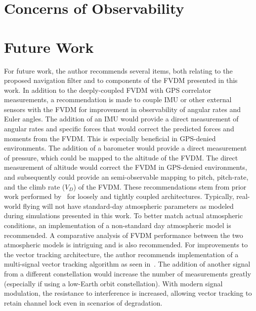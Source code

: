 \section{\textbf{Concerns of Observability}}
\section{\textbf{Future Work}}
For future work, the author recommends several items, both relating to the proposed navigation filter and to components of the FVDM presented in this work. In addition to the deeply-coupled FVDM with GPS correlator measurements, a recommendation is made to couple IMU or other external sensors with the FVDM for improvement in observability of angular rates and Euler angles. The addition of an IMU would provide a direct measurement of angular rates and specific forces that would correct the predicted forces and moments from the FVDM\@. This is especially beneficial in GPS-denied environments. The addition of a barometer would provide a direct measurement of pressure, which could be mapped to the altitude of the FVDM\@. The direct measurement of altitude would correct the FVDM in GPS-denied environments, and subsequently could provide an semi-observable mapping to pitch, pitch-rate, and the climb rate (\(V_D\)) of the FVDM\@. These recommendations stem from prior work performed by~\cite{khaghaniAssessmentVDMbasedAutonomous2018,khaghaniAutonomousVehicleDynamic2016,mwenegohaModelbasedTightlyCoupled2020} for loosely and tightly coupled architectures. Typically, real-world flying will not have standard-day atmospheric parameters as modeled during simulations presented in this work.  To better match actual atmospheric conditions, an implementation of a non-standard day atmospheric model is recommended. A comparative analysis of FVDM performance between the two atmospheric models is intriguing and is also recommended. For improvements to the vector tracking architecture, the author recommends implementation of a multi-signal vector tracking algorithm as seen in~\cite{givhanGPSL5Software2021}. The addition of another signal from a different constellation would increase the number of measurements greatly (especially if using a low-Earth orbit constellation). With modern signal modulation, the resistance to interference is increased, allowing vector tracking to retain channel lock even in scenarios of degradation.